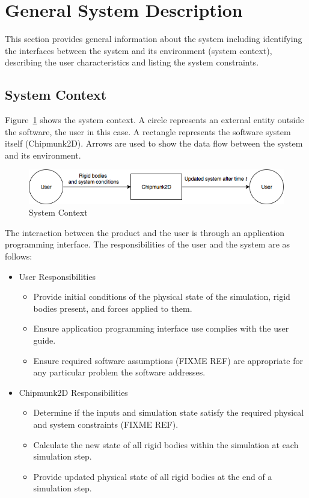 \documentclass[12pt]{article}
\begin{document}
\section{General System Description}
\label{Sec:GenSysDesc}
This section provides general information about the system including identifying the interfaces between the system and its environment (system context), describing the user characteristics and listing the system constraints.
\subsection{System Context}
\label{Sec:systemcontext}
Figure~\ref{Figure:sysCtxDiag} shows the system context. A circle represents an external entity outside the software, the user in this case. A rectangle represents the software system itself (Chipmunk2D). Arrows are used to show the data flow between the system and its environment.
\begin{figure}
\begin{center}
\includegraphics[width=\textwidth]{../../../datafiles/GamePhysics/sysctx.png}
\caption{System Context}
\label{Figure:sysCtxDiag}
\end{center}
\end{figure}
The interaction between the product and the user is through an application programming interface. The responsibilities of the user and the system are as follows:
\begin{itemize}
\item{User Responsibilities}
\begin{itemize}
\item{Provide initial conditions of the physical state of the simulation, rigid bodies present, and forces applied to them.}
\item{Ensure application programming interface use complies with the user guide.}
\item{Ensure required software assumptions (FIXME REF) are appropriate for any particular problem the software addresses.}
\end{itemize}
\item{Chipmunk2D Responsibilities}
\begin{itemize}
\item{Determine if the inputs and simulation state satisfy the required physical and system constraints (FIXME REF).}
\item{Calculate the new state of all rigid bodies within the simulation at each simulation step.}
\item{Provide updated physical state of all rigid bodies at the end of a simulation step.}
\end{itemize}
\end{itemize}
\end{document}

